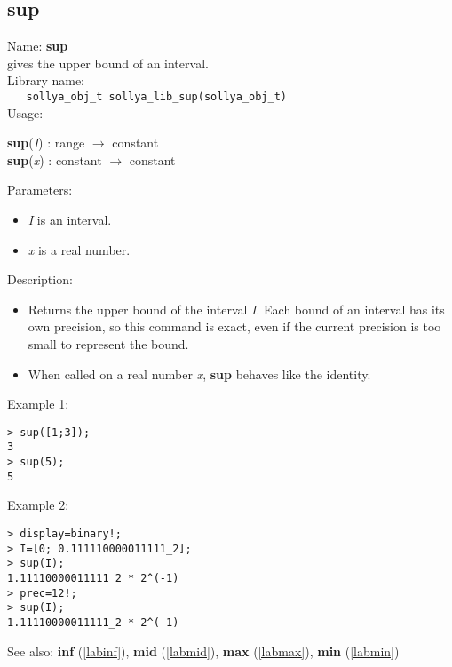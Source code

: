 \subsection{sup}
\label{labsup}
\noindent Name: \textbf{sup}\\
\phantom{aaa}gives the upper bound of an interval.\\[0.2cm]
\noindent Library name:\\
\verb|   sollya_obj_t sollya_lib_sup(sollya_obj_t)|\\[0.2cm]
\noindent Usage: 
\begin{center}
\textbf{sup}(\emph{I}) : \textsf{range} $\rightarrow$ \textsf{constant}\\
\textbf{sup}(\emph{x}) : \textsf{constant} $\rightarrow$ \textsf{constant}\\
\end{center}
Parameters: 
\begin{itemize}
\item \emph{I} is an interval.
\item \emph{x} is a real number.
\end{itemize}
\noindent Description: \begin{itemize}

\item Returns the upper bound of the interval \emph{I}. Each bound of an interval has its 
   own precision, so this command is exact, even if the current precision is too 
   small to represent the bound.

\item When called on a real number \emph{x}, \textbf{sup} behaves like the identity.
\end{itemize}
\noindent Example 1: 
\begin{center}\begin{minipage}{15cm}\begin{Verbatim}[frame=single,commandchars=\\\|\~]
> sup([1;3]);
3
> sup(5);
5
\end{Verbatim}
\end{minipage}\end{center}
\noindent Example 2: 
\begin{center}\begin{minipage}{15cm}\begin{Verbatim}[frame=single,commandchars=\\\|\~]
> display=binary!;
> I=[0; 0.111110000011111_2];
> sup(I);
1.11110000011111_2 * 2^(-1)
> prec=12!;
> sup(I);
1.11110000011111_2 * 2^(-1)
\end{Verbatim}
\end{minipage}\end{center}
See also: \textbf{inf} (\ref{labinf}), \textbf{mid} (\ref{labmid}), \textbf{max} (\ref{labmax}), \textbf{min} (\ref{labmin})
